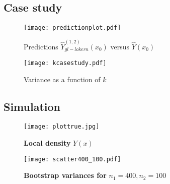 \documentclass[a4paper,12pt,leqno, titlepage]{article}
\begin{document}
\begin{appendix}
{{{\subsection{Case study}\label{appendixfigurescasestudy}

\begin{figure}[h]
\begin{center}
\caption{\label{predict1} Predictions $\hat{Y}^{(1,2)}_{gl-lokern}(x_0)$ versus $\hat{Y}(x_0)$}
\end{center}
\begin{center}
\texttt{[image: predictionplot.pdf]}
\end{center}
\end{figure}

\begin{figure}[h]
\begin{center}
\caption{\label{choiceofkcasestudy} Variance as a function of $k$}
\end{center}
\begin{center}
\texttt{[image: kcasestudy.pdf]}
\end{center}
\end{figure}
\clearpage\newpage


\subsection{Simulation}\label{appendixfiguressimulation}
 \begin{figure}[h]
\begin{center}
\caption{\label{plotdensity2}\textbf{Local density} $Y(x)$}
\end{center}
\begin{center}
\texttt{[image: plottrue.jpg]}
\end{center}
\end{figure}
\clearpage \newpage

\begin{figure}[h]
\begin{center}
\caption{\label{boot1} \textbf{Bootstrap variances for} $n_1=400,n_2=100$}
\end{center}
\begin{center}
\texttt{[image: scatter400\_100.pdf]}
\end{center}
\end{figure}

}}}
\end{appendix}
\end{document}
